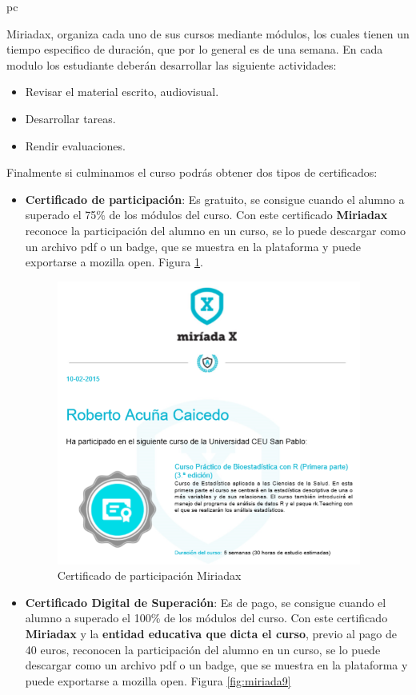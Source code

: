 pc\documentclass[a4paper,12pt,openany]{book}
\begin{document}
Miriadax, organiza cada uno de sus cursos mediante módulos, los cuales tienen un tiempo especifico de duración, que por lo general es de una semana. En cada modulo los estudiante deberán desarrollar las siguiente actividades:

\begin{itemize}
\item Revisar el material escrito, audiovisual.
\item Desarrollar tareas.
\item Rendir evaluaciones.
\end{itemize}

Finalmente si culminamos el curso podrás obtener dos tipos de certificados:

\begin{itemize}
\item \textbf{Certificado de participación}: Es gratuito, se consigue cuando el alumno a superado el 75\% de los módulos del curso. Con este certificado \textbf{Miriadax} reconoce la participación del alumno en un curso, se lo puede descargar como un archivo pdf o un badge, que se muestra en la plataforma y puede exportarse a mozilla open. Figura \ref{fig:miriada8}.  

\begin{figure}[ht]
  \centering
	\includegraphics[width=10cm]{miriada8.png}
\caption{Certificado de participación Miriadax}
  \label{fig:miriada8}
\end{figure}

\item \textbf{Certificado Digital de Superación}: Es de pago, se consigue cuando el alumno a superado el 100\% de los módulos del curso. Con este certificado \textbf{Miriadax} y la \textbf{entidad educativa que dicta el curso}, previo al pago de 40 euros, reconocen la participación del alumno en un curso, se lo puede descargar como un archivo pdf o un badge, que se muestra en la plataforma y puede exportarse a mozilla open. Figura \ref{fig:miriada9}


\end{itemize}
\end{document}
